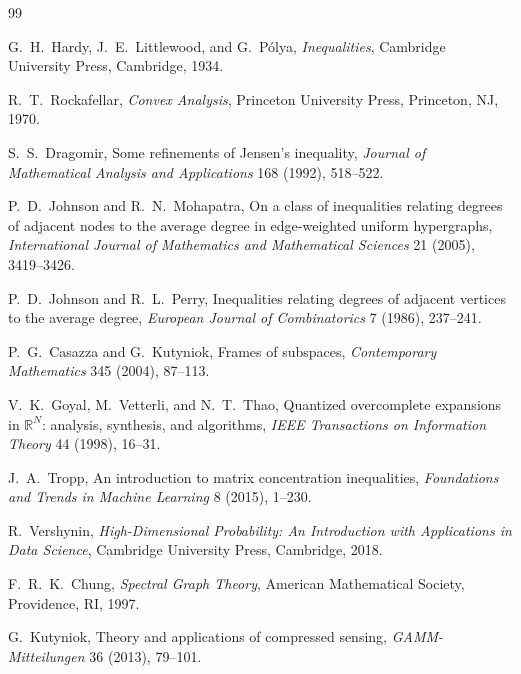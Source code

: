 \documentclass[final,1p,times]{elsarticle}
\begin{document}
\begin{thebibliography}{99}

G.~H.~Hardy, J.~E.~Littlewood, and G.~P\'olya,
{\em Inequalities},
Cambridge University Press, Cambridge, 1934.

R.~T.~Rockafellar,
{\em Convex Analysis},
Princeton University Press, Princeton, NJ, 1970.

S.~S.~Dragomir,
Some refinements of Jensen's inequality,
{\em Journal of Mathematical Analysis and Applications} 168 (1992), 518--522.

P.~D.~Johnson and R.~N.~Mohapatra,
On a class of inequalities relating degrees of adjacent nodes to the average degree in edge-weighted uniform hypergraphs,
{\em International Journal of Mathematics and Mathematical Sciences} 21 (2005), 3419--3426.

P.~D.~Johnson and R.~L.~Perry,
Inequalities relating degrees of adjacent vertices to the average degree,
{\em European Journal of Combinatorics} 7 (1986), 237--241.

P.~G.~Casazza and G.~Kutyniok,
Frames of subspaces,
{\em Contemporary Mathematics} 345 (2004), 87--113.

V.~K.~Goyal, M.~Vetterli, and N.~T.~Thao,
Quantized overcomplete expansions in $\mathbb{R}^N$: analysis, synthesis, and algorithms,
{\em IEEE Transactions on Information Theory} 44 (1998), 16--31.

J.~A.~Tropp,
An introduction to matrix concentration inequalities,
{\em Foundations and Trends in Machine Learning} 8 (2015), 1--230.

R.~Vershynin,
{\em High-Dimensional Probability: An Introduction with Applications in Data Science},
Cambridge University Press, Cambridge, 2018.

F.~R.~K.~Chung,
{\em Spectral Graph Theory},
American Mathematical Society, Providence, RI, 1997.

G.~Kutyniok,
Theory and applications of compressed sensing,
{\em GAMM-Mitteilungen} 36 (2013), 79--101.

\end{thebibliography}
\end{document}
